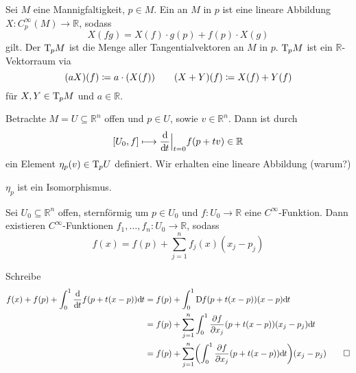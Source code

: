 \begin{definition}[{name=[Tangentialvektor und Tangentialraum]}]
	Sei $M$ eine Mannigfaltigkeit, $p \in M$.
	Ein  an $M$ in $p$ ist eine lineare Abbildung $X \colon C^\infty_p(M) \to \mathbb{R}$, sodass 
	\[
		X(fg) = X(f) \cdot g(p) + f(p) \cdot X(g)
	\] 
	gilt.
	Der  $\Tang_p M$ ist die Menge aller Tangentialvektoren an $M$ in $p$.
	$\Tang_p M$ ist ein $\mathbb{R}$-Vektorraum via
	\[
		(a X)(f) \coloneqq a \cdot \enbrace*{X(f)} \qquad (X+Y)(f) \coloneqq X(f) + Y(f)
	\]
	für $X,Y \in \Tang_p M$ und $a \in \mathbb{R}$.
\end{definition}

\begin{beispiel}[{name=[offene Teilmenge des euklidischen Raumes]}]
	Betrachte $M = U \subseteq \mathbb{R}^n$ offen und $p \in U$, sowie $v \in \mathbb{R}^n$.
	Dann ist durch
	\[
		\benbrace*{U_0,f} \longmapsto \diffd{}{t}\Big|_{t=0} f(p + tv) \in \mathbb{R}
	\]
	ein Element $\eta_p(v) \in \Tang_p U$ definiert.
	Wir erhalten eine lineare Abbildung (warum?)
\end{beispiel}

\begin{lemma}[label=lem:eta-iso]
	$\eta_p$ ist ein Isomorphismus.
\end{lemma}

\begin{lemma}[label=lem:summe-fkt]
	Sei $U_0 \subseteq \mathbb{R}^n$ offen, sternförmig um $p \in U_0$ und $f \colon U_0 \to \mathbb{R}$ eine $C^\infty$-Funktion.
	Dann existieren $C^\infty$-Funktionen $f_1, \ldots ,f_n \colon U_0 \to \mathbb{R}$, sodass
	\[
		f(x) = f(p) + \sum_{j=1}^{n} f_j(x) (x_j -p_j)
	\]
\end{lemma}
\begin{beweis}
	Schreibe 
	\begin{align}
		f(x) + f(p) + \int_0^1 \diffd{}{t} f \enbrace*{p + t(x-p)} \mathd t &= f(p) + \int_0^1 \D f \enbrace*{p + t(x-p)}(x-p) \mathd t \\
		&= f(p) + \sum_{j=1}^{n} \int_0^1 \diff{f}{x_j} \enbrace*{p + t(x-p)}(x_j -p_j) \mathd t\\
		&= f(p) + \sum_{j=1}^{n} \enbrace*{ \int_0^1 \diff{f}{x_j} \enbrace*{p+t(x-p)} \mathd t }(x_j -p_j) \qedhere
	\end{align}
\end{beweis}

